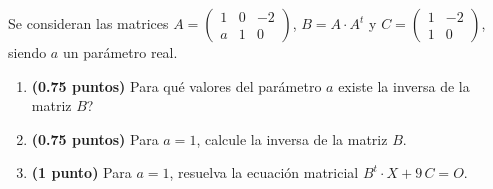 
Se consideran las matrices
$A=\begin{pmatrix}1&0&-2\\a&1&0\end{pmatrix}$,
$B=A\cdot A^t$ y $C=\begin{pmatrix}1&-2\\1&0\end{pmatrix}$,
siendo $a$ un parámetro real.
\begin{enumerate}[label=\alph*)]
  \item \textbf{(0.75 puntos)} \textquestiondown{}Para qué valores del
  parámetro $a$ existe la inversa de la matriz $B$?
  \item \textbf{(0.75 puntos)} Para $a=1$, calcule la inversa de la matriz $B$.
  \item \textbf{(1 punto)} Para $a=1$, resuelva la ecuación matricial
  $B^t\cdot X+9\,C=O$.
\end{enumerate}
